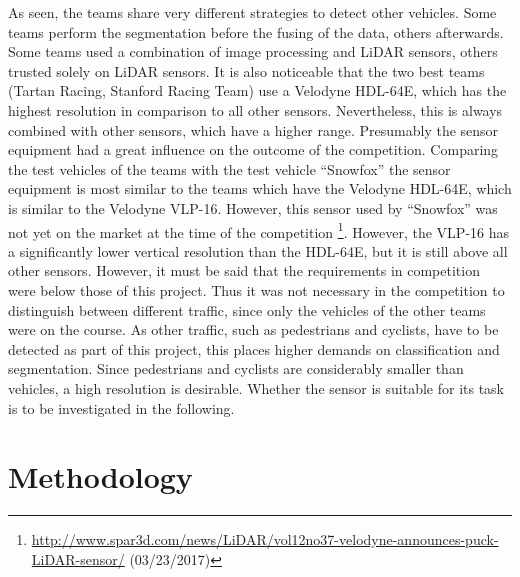 \documentclass[11pt,oneside,openright]{mpreport}
\begin{document}
As seen, the teams share very different strategies to detect other vehicles. Some teams perform the segmentation before the fusing of the data, others afterwards.
Some teams used a combination of image processing and LiDAR sensors, others trusted solely on LiDAR sensors. 
It is also noticeable that the two best teams (Tartan Racing, Stanford Racing Team) use a Velodyne HDL-64E,
which has the highest resolution in comparison to all other sensors. Nevertheless, this is always combined with other sensors, which have a higher range. 
Presumably the sensor equipment had a great influence on the outcome of the competition. Comparing the test vehicles of the teams with the test vehicle ``Snowfox'' the sensor equipment
is most similar to the teams which have the Velodyne HDL-64E, which is similar to the Velodyne VLP-16.
However, this sensor used by ``Snowfox'' was not yet on the market at the time of the competition \footnote{\url{http://www.spar3d.com/news/LiDAR/vol12no37-velodyne-announces-puck-LiDAR-sensor/}
(03/23/2017)}. However, the VLP-16 has a significantly lower vertical resolution than the HDL-64E, but it is still above all other sensors.
However, it must be said that the requirements in competition were below those of this project. Thus it was not necessary in the competition to distinguish between 
different traffic, since only the vehicles of the other teams were on the course. As other traffic, such as pedestrians and cyclists, have to be detected as part of this project,
this places higher demands on classification and segmentation. Since pedestrians and cyclists are considerably smaller than vehicles, a high resolution is desirable. 
Whether the sensor is suitable for its task is to be investigated in the following.





\chapter{Methodology}
\end{document}
